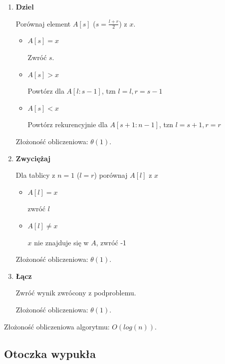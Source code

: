 \documentclass[12pt]{article}
\begin{document}
        \begin{enumerate}
            \item \textbf{Dziel}
                
                Porównaj element $A[s]$ ($s = \frac{l+ r}{2}$) z $x$.
                
                \begin{itemize}
                    \item $A[s] = x$ 

                        Zwróć $s$.

                    \item $A[s] > x$

                        Powtórz dla $A[l : s - 1]$, tzn $l = l, r = s - 1$ 

                    \item $A[s] < x$

                        Powtórz rekurencyjnie dla $A[s + 1 : n - 1]$, tzn $l = s + 1, r = r$
                \end{itemize}

                Złożoność obliczeniowa: $\theta(1)$.
            
            \item \textbf{Zwyciężaj}

                Dla tablicy z $n = 1$ ($l = r$) porównaj $A[l]$ z $x$

                \begin{itemize}
                    \item $A[l] = x$

                        zwróć $l$
                    \item $A[l] \neq x$

                        $x$ nie znajduje się w $A$, zwróć -1
                \end{itemize}

                Złożoność obliczeniowa: $\theta(1)$.

            \item \textbf{Łącz}

                Zwróć wynik zwrócony z podproblemu.

                Złożoność obliczeniowa: $\theta(1)$.
        \end{enumerate}
        
        Złożoność obliczeniowa algorytmu: $O(log(n))$.
        
        \subsection{Otoczka wypukła}
\end{document}
